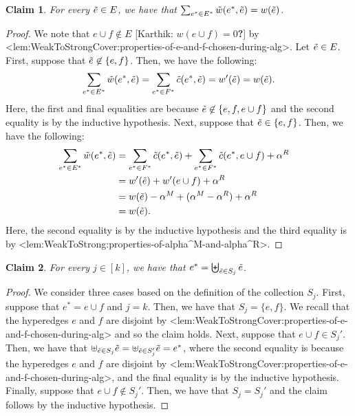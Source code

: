 \documentclass{article}
\def\Cref#1{<#1>}%
\newtheorem{claim}{Claim}[section]
\newcommand{\knote}[1]{{\color{red}[{\tiny Karthik: \bf #1}]\marginpar{\color{red}*}}}
\begin{document}
    \begin{claim}\label{claim:weak-to-strong:correctness:main:hyperedge-merge:property1}
        For every $\Tilde{e} \in E$, we have that $\sum_{e^* \in E^*}\Tilde{w}(e^*, \Tilde{e}) = w(\Tilde{e})$.
    \end{claim}
    \begin{proof}
        We note that $e \cup f \not \in E$ \knote{$w(e\cup f)=0$?} by \Cref{lem:WeakToStrongCover:properties-of-e-and-f-chosen-during-alg}. Let $\Tilde{e} \in E$. First, suppose that $\Tilde{e} \not \in \{e, f\}$. Then, we have the following:
        $$\sum_{e^* \in E^*}\Tilde{w}(e^*, \Tilde{e}) = \sum_{e^* \in F^*}\Tilde{c}(e^*, \Tilde{e}) = w'(\Tilde{e}) = w(\Tilde{e}).$$
        Here, the first and final equalities are because $\Tilde{e} \not \in \{e, f, e\cup f\}$ and the second equality is by the inductive hypothesis. Next, suppose that $\Tilde{e} \in \{e, f\}$. Then, we have the following:
        \begin{align*}
            \sum_{e^* \in E^*}\Tilde{w}(e^*, \Tilde{e})&= \sum_{e^* \in F^*}\Tilde{c}(e^*, \Tilde{e}) + \sum_{e^* \in F^*}\Tilde{c}(e^*, e\cup f) + \alpha^R&\\
            &= w'(\Tilde{e}) + w'(e\cup f) + \alpha^R&\\
            & = w(\Tilde{e}) - \alpha^M + (\alpha^M - \alpha^R) + \alpha^R&\\
            &= w(\Tilde{e}).  &
        \end{align*}
        Here, the second equality is by the inductive hypothesis and the third equality is by \Cref{lem:WeakToStrong:properties-of-alpha^M-and-alpha^R}.
    \end{proof}

\begin{claim}\label{claim:weak-to-strong:correctness:main:hyperedge-merge:property2}
    For every $j \in [k]$, we have that $e^* = \biguplus_{\Tilde{e} \in S_j}\Tilde{e}$.
\end{claim}
\begin{proof}
    We consider three cases based on the definition of the collection $S_j$. First, suppose that $e^* = e \cup f$ and $j = k$. Then, we have that $S_j = \{e, f\}$. We recall that the hyperedges $e$ and $f$ are disjoint by \Cref{lem:WeakToStrongCover:properties-of-e-and-f-chosen-during-alg} and so the claim holds. Next, suppose that $e \cup f \in S_j'$. Then, we have that $\uplus_{\Tilde{e} \in S_j} \Tilde{e} = \uplus_{\Tilde{e} \in S_j'} \Tilde{e} = e^*$, where the second equality is  because the hyperedges $e$ and $f$ are disjoint by \Cref{lem:WeakToStrongCover:properties-of-e-and-f-chosen-during-alg}, and the final equality is by the inductive hypothesis. Finally, suppose that $e\cup f \not \in S_j'$. Then, we have that $S_j = S_j'$ and the claim follows by the inductive hypothesis.
\end{proof}
\end{document}
